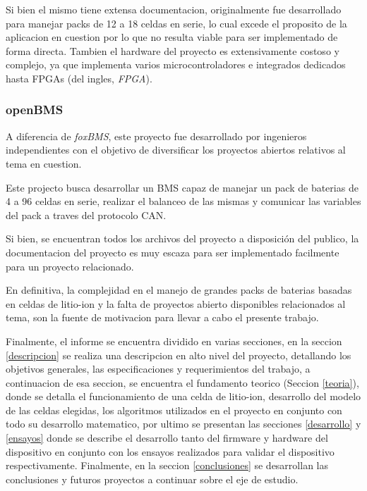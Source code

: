 \documentclass[10pt,a4paper]{article}
\begin{document}
\noindent Si bien el mismo tiene extensa documentacion, originalmente fue
desarrollado para manejar packs de 12 a 18 celdas en serie, lo cual excede el
proposito de la aplicacion en cuestion por lo que no resulta viable para ser
implementado de forma directa. Tambien el hardware del proyecto es
extensivamente costoso y complejo, ya que implementa varios microcontroladores e
integrados dedicados hasta \acrshort{FPGA}s (del ingles, \emph{\acrlong{FPGA}}).

\subsubsection{openBMS}

A diferencia de \emph{foxBMS}, este proyecto fue desarrollado por ingenieros
independientes con el objetivo de diversificar los proyectos abiertos relativos
al tema en cuestion.

\noindent Este projecto busca desarrollar un \acrshort{BMS} capaz de manejar un
pack de baterias de 4 a 96 celdas en serie, realizar el balanceo de las mismas y
comunicar las variables del pack a traves del protocolo \acrshort{CAN}.

\noindent Si bien, se encuentran todos los archivos del proyecto a disposición
del publico, la documentacion del proyecto es muy escaza para ser implementado
facilmente para un proyecto relacionado.

\noindent En definitiva, la complejidad en el manejo de grandes packs de
baterias basadas en celdas de litio-ion y la falta de proyectos abierto
disponibles relacionados al tema, son la fuente de motivacion para llevar a cabo
el presente trabajo.

\noindent Finalmente, el informe se encuentra dividido en varias secciones, en
la seccion \ref{descripcion} se realiza una descripcion en alto nivel del
proyecto, detallando los objetivos generales, las especificaciones y
requerimientos del trabajo, a continuacion de esa seccion, se encuentra el
fundamento teorico (Seccion \ref{teoria}), donde se detalla el funcionamiento de
una celda de litio-ion, desarrollo del modelo de las celdas elegidas, los
algoritmos utilizados en el proyecto en conjunto con todo su desarrollo
matematico, por ultimo se presentan las secciones \ref{desarrollo} y
\ref{ensayos} donde se describe el desarrollo tanto del firmware y hardware del
dispositivo en conjunto con los ensayos realizados para validar el dispositivo
respectivamente. Finalmente, en la seccion \ref{conclusiones} se desarrollan las
conclusiones y futuros proyectos a continuar sobre el eje de estudio.
\end{document}
